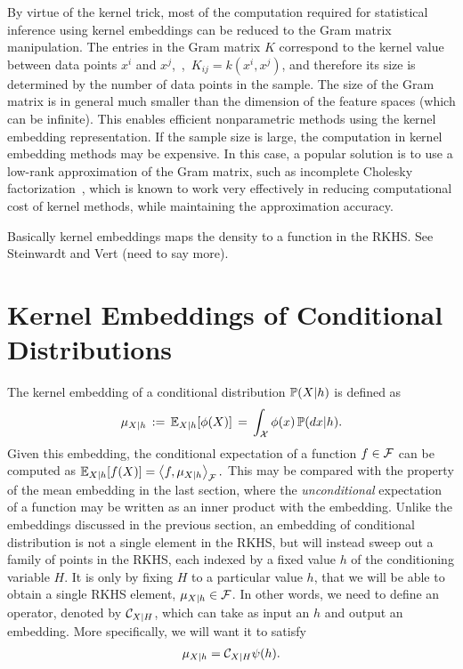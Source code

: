 \documentclass[11pt]{article}
\begin{document}
By virtue of the kernel trick, most of the computation required for statistical inference using kernel embeddings can be reduced to the Gram matrix manipulation. The entries in the Gram matrix $K$ correspond to the kernel value between data points $x^i$ and $x^j$,~\ie,~$K_{ij} = k(x^i,x^j)$, and therefore its size is determined by the number of data points in the sample. The size of the Gram matrix is in general much smaller than the dimension of the feature spaces (which can be infinite). This enables efficient nonparametric methods using the kernel embedding representation. If the sample size is large, the computation in kernel embedding methods may be expensive. In this case, a popular solution is to use a low-rank approximation of the Gram matrix, such as incomplete Cholesky factorization~\cite{FinSch01}, which is known to work very effectively in reducing computational cost of kernel methods, while maintaining the approximation accuracy.

 Basically kernel embeddings maps the density to a function in the RKHS. See Steinwardt and Vert (need to say more).

\section{Kernel Embeddings of Conditional Distributions}
\label{sec:conditionalembedding}

The kernel embedding of a conditional distribution $\mathbb{P}(X|h)$ is defined as~\cite{SonHuaSmoFuk09}
\begin{align}
    \label{eq:conditionalembedding}
    \mu_{X|h}\, :=\, \mathbb{E}_{X|h}[\phi(X)]\, =\, \int_{\mathcal{X}} \phi(x) \, \mathbb{P}(dx|h).
\end{align}
Given this embedding, the conditional expectation of a function $f\in \mathcal{F}$  can be computed as
$
    \label{eq:conditionalexpectation}
    \mathbb{E}_{X|h}[f(X)] = \left\langle f,\mu_{X|h} \right\rangle_{\mathcal{F}}.
$
This may be compared with the property of the mean embedding in the last section,
where the {\em unconditional} expectation of a function may be written as an inner product with the embedding.
Unlike the embeddings discussed in the previous section, an embedding of conditional distribution is not a single element in the RKHS, but will instead sweep out a family of
points in the RKHS, each indexed by a fixed value $h$ of the conditioning variable $H$. It is only
by fixing $H$ to a particular value $h$, that we will be able to obtain a single RKHS element, $\mu_{X|h}\in\mathcal{F}$. In other words, we need to define an operator, denoted by $\mathcal{C}_{X|H}$, which can take as input an $h$ and output an embedding. More specifically, we will
want it to satisfy
\begin{align}
    \label{eq:conditionalembeddingrequirement}
    \mu_{X|h} = \mathcal{C}_{X|H} \psi(h).
\end{align}
\end{document}
